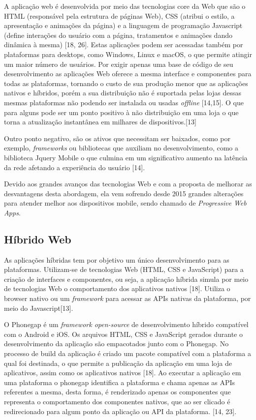 A aplicação web é desenvolvida por meio das tecnologias core da Web que são o HTML (responsável pela estrutura de páginas Web), CSS (atribui o estilo, a apresentação e animações da página) e a linguagem de programação Javascript (define interações do usuário com a página, tratamentos e animações dando dinâmica à mesma) [18, 26]. Estas aplicações podem ser acessadas também por plataformas para desktops, como Windows, Linux e macOS, o que permite atingir um maior número de usuários. Por exigir apenas uma base de código de seu desenvolvimento as aplicações Web oferece a mesma interface e componentes para todas as plataformas, tornando o custo de sua produção menor que as aplicações nativos e híbridos, porém a sua distribuição não é suportada pelas lojas dessas mesmas plataformas não podendo ser instalada ou usadas \textit{offline} [14,15]. O que para alguns pode ser um ponto positivo à não distribuição em uma loja o que torna a atualização instantânea em milhares de dispositivos.[13]

Outro ponto negativo, são os ativos que necessitam ser baixados, como por exemplo, \textit{frameworks} ou bibliotecas que auxiliam no desenvolvimento, como a biblioteca Jquery Mobile o que culmina em um significativo aumento na latência da rede afetando a experiência do usuário [14].

Devido aos grandes avanços das tecnologias Web e com a proposta de melhorar as desvantagens desta abordagem, ela vem sofrendo desde 2015 grandes alterações para atender melhor aos dispositivos mobile, sendo chamado de \textit{Progressive Web Apps}.

\subsection{\esp Híbrido Web}

As aplicações híbridas tem por objetivo um único desenvolvimento para as plataformas. Utilizam-se de tecnologias Web (HTML, CSS e JavaScript) para a criação de interfaces e componentes, ou seja, a aplicação híbrida simula por meio de tecnologias Web o comportamento dos aplicativos nativos [18]. Utiliza o browser nativo ou um \textit{framework} para acessar as APIs nativas da plataforma, por meio do Javascript[13].

O Phonegap é um \textit{framework open-source} de desenvolvimento híbrido compatível com o Android e iOS. Os arquivos HTML, CSS e JavaScript gerados durante o desenvolvimento da aplicação são empacotados junto com o Phonegap. No processo de build da aplicação é criado um pacote compatível com a plataforma a qual foi destinada, o que permite a publicação da aplicação em uma loja de aplicativos, assim como os aplicativos nativos [18]. Ao executar a aplicação em uma plataforma o phonegap identifica a plataforma e chama apenas as APIs referentes a mesma, desta forma, é renderizado apenas os componentes que representa o comportamento dos componentes nativos, que ao ser clicado é redirecionado para algum ponto da aplicação ou API da plataforma. [14, 23].

